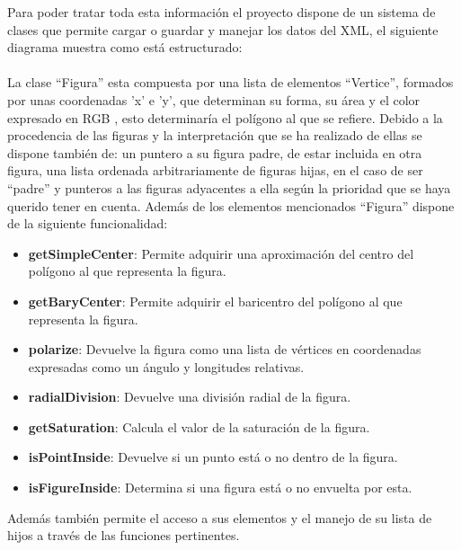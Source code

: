 
Para poder tratar toda esta información el proyecto dispone de un sistema de clases que permite cargar o guardar y manejar los datos del XML, el siguiente diagrama muestra como está estructurado:
\\
\newline
\\La clase ``Figura'' esta compuesta por una lista de elementos ``Vertice'', formados por unas coordenadas 'x' e 'y', que determinan su forma, su área y el color expresado en RGB , esto determinaría el polígono al que se refiere. Debido a la procedencia de las figuras y la interpretación que se ha realizado de ellas se dispone también de: un puntero a su figura padre, de estar incluida en otra figura, una lista ordenada arbitrariamente de figuras hijas, en el caso de ser ``padre'' y punteros a las figuras adyacentes a ella según la prioridad que se haya querido tener en cuenta. Además de los elementos mencionados ``Figura'' dispone de la siguiente funcionalidad:
\begin{itemize}
\item \textbf{getSimpleCenter}: Permite adquirir una aproximación del centro del polígono al que representa la figura.
\item \textbf{getBaryCenter}: Permite adquirir el baricentro del polígono al que representa la figura.
\item \textbf{polarize}: Devuelve la figura como una lista de vértices en coordenadas expresadas como un ángulo y longitudes relativas. 
\item \textbf{radialDivision}: Devuelve una división radial de la figura.
\item \textbf{getSaturation}: Calcula el valor de la saturación de la figura.
\item \textbf{isPointInside}: Devuelve si un punto está o no dentro de la figura.
\item \textbf{isFigureInside}: Determina si una figura está o no envuelta por esta.
\end{itemize}
Además también permite el acceso a sus elementos y el manejo de su lista de hijos a través de las funciones pertinentes.
\newline
{}
